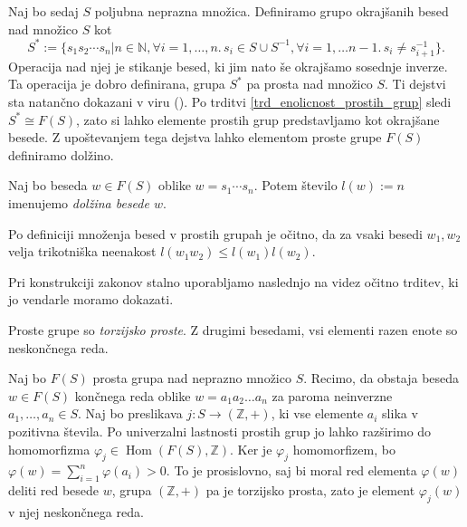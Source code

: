 Naj bo sedaj $S$ poljubna neprazna množica. Definiramo grupo okrajšanih besed nad množico $S$ kot \begin{equation*}
    S^* := \{ s_1 s_2 \cdots s_n  \vert n \in \mathbb{N}, \forall i = 1, \ldots, n.\,  s_i \in S \cup S^{-1} , \forall i = 1 , \ldots n-1 .\, s_i \neq s_{i + 1}^{-1} \}.
\end{equation*}
Operacija nad njej je stikanje besed, ki jim nato še okrajšamo sosednje inverze. Ta operacija je dobro definirana, grupa $S^*$ pa prosta nad množico $S$. 
Ti dejstvi sta natančno dokazani v viru (\cite[str.~4, tridtev 1.9]{Lyndon_Schupp_2015}). Po trditvi \ref{trd_enolicnost_prostih_grup} sledi $S^* \cong F(S)$,
zato si lahko elemente prostih grup predstavljamo kot okrajšane besede. Z upoštevanjem tega dejstva lahko elementom proste grupe $F(S)$ definiramo dolžino.

\begin{definicija}
\label{def_dolzina_besede}
Naj bo beseda $w \in  F(S)$ oblike $w = s_1 \cdots s_n$. Potem število $l(w) := n$ imenujemo \emph{dolžina besede $w$}.
\end{definicija}
\begin{opomba}\label{opm_trikotniska_neenakost}
    Po definiciji množenja besed v prostih grupah je očitno, da za vsaki besedi $w_1 , w_2$ velja trikotniška neenakost $l(w_1 w_2) \le l(w_1) l(w_2)$.
\end{opomba}

Pri konstrukciji zakonov stalno uporabljamo naslednjo na videz očitno trditev, ki jo vendarle moramo dokazati. 

\begin{trditev}\label{trd_prosta_grupa_je_torzijsko_prosta}
    Proste grupe so \emph{torzijsko proste}. Z drugimi besedami, vsi elementi razen enote so neskončnega reda. 
\end{trditev}
\begin{dokaz}
    Naj bo $F(S)$ prosta grupa nad neprazno množico $S$. Recimo, da obstaja beseda $w \in F(S)$ končnega reda oblike $w = a_1 a_2 \ldots a_n$ za paroma neinverzne $a_1, \ldots , a_n \in S$. Naj bo preslikava $j : S \to (\mathbb{Z}, +)$, ki vse elemente $a_i$ slika v pozitivna števila. Po univerzalni lastnosti prostih grup jo lahko razširimo do homomorfizma $\varphi_j \in \operatorname{Hom}(F(S), \mathbb{Z})$. 
    Ker je $\varphi_j$ homomorfizem, bo $\varphi(w) = \sum_{i = 1}^{n} \varphi(a_i) > 0$. To je prosislovno, saj bi moral red elementa $\varphi(w)$ deliti red besede $w$,
    grupa $(\mathbb{Z}, +)$ pa je torzijsko prosta, zato je element $\varphi_j(w)$ v njej neskončnega reda.
\end{dokaz}


